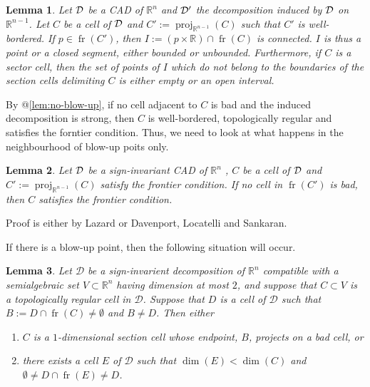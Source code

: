 \documentclass[
]{book}
\providecommand{\tightlist}{%
  \setlength{\itemsep}{0pt}\setlength{\parskip}{0pt}}
\newtheorem{lemma}{Lemma}[chapter]
\theoremstyle{definition}
\theoremstyle{definition}
\theoremstyle{definition}
\theoremstyle{definition}
\theoremstyle{remark}
\begin{document}
\begin{lemma}
\protect\hypertarget{lem:lazard-5-2}{}\label{lem:lazard-5-2}\citep[Proposition 5,2]{lazard10}
Let \(\cal D\) be a CAD of \(\mathbb{R}^n\) and \(\cal D'\) the decomposition induced by \(\cal D\) on \(\mathbb{R}^{n-1}\). Let \(C\) be a cell of \(\cal D\) and \(C' := {\operatorname{proj}_{\mathbb{R}^{n-1}}} (C)\) such that \(C'\) is well-bordered.
If \(p \in {\operatorname{fr} \left( C' \right)}\), then \(I := (p \times \mathbb{R}) \cap {\operatorname{fr} \left( C \right)}\) is connected.
\(I\) is thus a point or a closed segment, either bounded or unbounded.
Furthermore, if \(C\) is a sector cell, then the set of points of \(I\) which do not belong to the boundaries of the section cells delimiting \(C\) is either empty or an open interval.
\end{lemma}

By @\ref{lem:no-blow-up}, if no cell adjacent to \(C\) is bad and the induced decomposition is strong, then \(C\) is well-bordered, topologically regular and satisfies the forntier condition. Thus, we need to look at what happens in the neighbourhood of blow-up poits only.

\begin{lemma}
Let \(\cal D\) be a sign-invariant CAD of \(\mathbb{R}^n\) , \(C\) be a cell of \(\cal D\) and \(C' := {\operatorname{proj}_{\mathbb{R}^{n-1}}}(C)\) satisfy the frontier condition. If no cell in \({\operatorname{fr} \left( C' \right)}\) is bad, then \(C\) satisfies the frontier condition.
\end{lemma}

Proof is either by Lazard or Davenport, Locatelli and Sankaran.

If there is a blow-up point, then the following situation will occur.

\begin{lemma}

Let \(\mathcal{D}\) be a sign-invarient decomposition of \(\mathbb{R}^n\) compatible with a semialgebraic set \(V \subset \mathbb{R}^n\) having dimension at most \(2\), and suppose that \(C \subset V\) is a topologically regular cell in \(\mathcal{D}\).
Suppose that \(D\) is a cell of \(\mathcal{D}\) such that \(B := D \cap {\operatorname{fr} \left(  C  \right)} \neq \emptyset\) and \(B \neq D\). Then either

\begin{enumerate}
\def\labelenumi{\arabic{enumi}.}
\tightlist
\item
  \(C\) is a \(1\)-dimensional section cell whose endpoint, \(B\), projects on a bad cell, or
\item
  there exists a cell \(E\) of \(\mathcal{D}\) such that \(\dim(E) < \dim(C)\) and \(\emptyset \neq D \cap {\operatorname{fr} \left(  E  \right)} \neq D\).
\end{enumerate}

\end{lemma}
\end{document}
